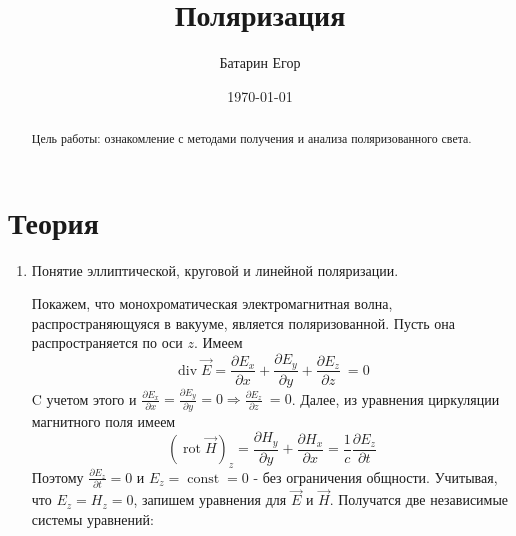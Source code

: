 \documentclass[a4paper,12pt]{article}
\author{Батарин Егор}
\title{Поляризация}
\date{\today}
\theoremstyle{plain} %
\theoremstyle{definition} %
\theoremstyle{remark} %
\begin{document}
 
\maketitle
 
\begin{abstract}
   Цель работы: ознакомление с методами получения и анализа поляризованного света.
\end{abstract}
 
\section{Теория}
\begin{enumerate}
\item Понятие эллиптической, круговой и линейной поляризации.

Покажем, что монохроматическая электромагнитная волна, распространяющуяся в вакууме, является поляризованной. Пусть она распространяется по оси $z$. Имеем
\[ \operatorname{div}\vec{E} =  \frac{\partial E_x}{\partial x} +  \frac{\partial E_y}{\partial y} +  \frac{\partial E_z}{\partial z}\ = 0 \]
C учетом этого и $ \frac{\partial E_x}{\partial x} = \frac{\partial E_y}{\partial y} = 0 \Rightarrow  \frac{\partial E_z}{\partial z}\ = 0$. Далее, из уравнения циркуляции магнитного поля имеем
\[  \left(\operatorname{rot}\vec{H}\right)_z =  \frac{\partial H_y}{\partial y} +  \frac{\partial H_x}{\partial x}  = \frac{1}{c}\frac{\partial E_z}{\partial t} \]
Поэтому $\frac{\partial E_z}{\partial t} = 0$ и $E_z = \operatorname{const} = 0$ - без ограничения общности. Учитывая, что $E_z = H_z = 0$, запишем уравнения для $\vec{E}$ и $\vec{H}$. Получатся две независимые системы уравнений:


\end{enumerate}
\end{document}

